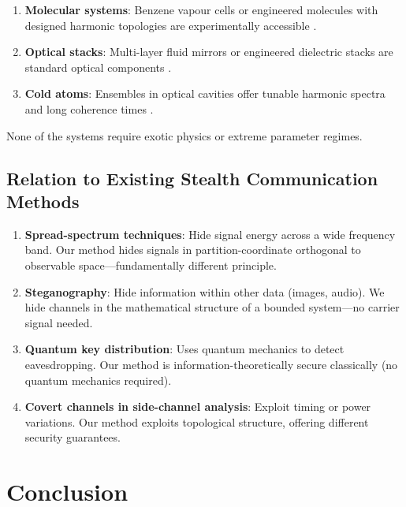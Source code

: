 \documentclass[11pt,twocolumn,a4paper]{article}
\theoremstyle{definition}
\begin{document}
\begin{enumerate}[nosep]
\item \textbf{Molecular systems}: Benzene vapour cells or engineered molecules with designed harmonic topologies are experimentally accessible \cite{Herzberg1945}.

\item \textbf{Optical stacks}: Multi-layer fluid mirrors or engineered dielectric stacks are standard optical components \cite{BornWolf1999}.

\item \textbf{Cold atoms}: Ensembles in optical cavities offer tunable harmonic spectra and long coherence times \cite{Stenholm1986}.
\end{enumerate}

None of the systems require exotic physics or extreme parameter regimes.

\subsection{Relation to Existing Stealth Communication Methods}

\begin{enumerate}[nosep]
\item \textbf{Spread-spectrum techniques}: Hide signal energy across a wide frequency band. Our method hides signals in partition-coordinate orthogonal to observable space—fundamentally different principle.

\item \textbf{Steganography}: Hide information within other data (images, audio). We hide channels in the mathematical structure of a bounded system—no carrier signal needed.

\item \textbf{Quantum key distribution}: Uses quantum mechanics to detect eavesdropping. Our method is information-theoretically secure classically (no quantum mechanics required).

\item \textbf{Covert channels in side-channel analysis}: Exploit timing or power variations. Our method exploits topological structure, offering different security guarantees.
\end{enumerate}

\section{Conclusion}
\label{sec:conclusion}
\end{document}
